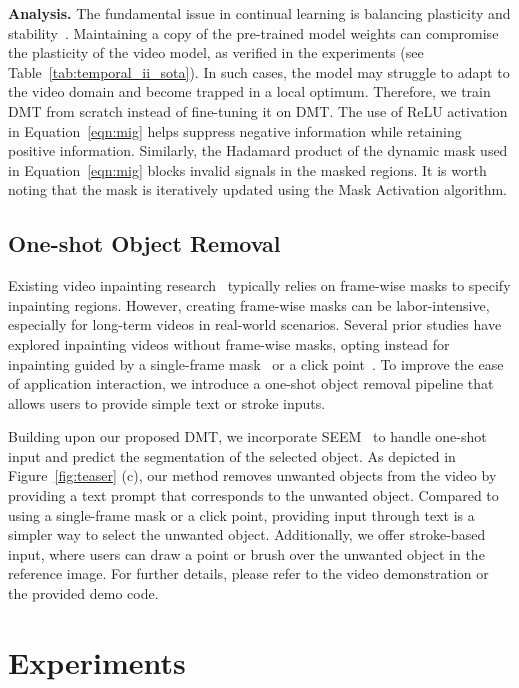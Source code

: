\documentclass[10pt,twocolumn,letterpaper]{article}
\begin{document}
{\noindent\bf Analysis.} The fundamental issue in continual learning is balancing plasticity and stability~\cite{mermillod2013stability}. Maintaining a copy of the pre-trained model weights can compromise the plasticity of the video model, as verified in the experiments (see Table~\ref{tab:temporal_ii_sota}). In such cases, the model may struggle to adapt to the video domain and become trapped in a local optimum. Therefore, we train DMT from scratch instead of fine-tuning it on DMT. The use of ReLU activation in Equation~\ref{eqn:mig} helps suppress negative information while retaining positive information. Similarly, the Hadamard product of the dynamic mask  used in Equation~\ref{eqn:mig} blocks invalid signals in the masked regions. It is worth noting that the mask  is iteratively updated using the Mask Activation algorithm.

\subsection{One-shot Object Removal}

Existing video inpainting research~\cite{li22e2fgvi,zhang22flow,cai22devit} typically relies on frame-wise masks to specify inpainting regions. However, creating frame-wise masks can be labor-intensive, especially for long-term videos in real-world scenarios. Several prior studies have explored inpainting videos without frame-wise masks, opting instead for inpainting guided by a single-frame mask~\cite{ouyang21inter, lee2023one} or a click point~\cite{yang2023track}. To improve the ease of application interaction, we introduce a one-shot object removal pipeline that allows users to provide simple text or stroke inputs.

Building upon our proposed DMT, we incorporate SEEM~\cite{zou2023seem} to handle one-shot input and predict the segmentation of the selected object. As depicted in Figure~\ref{fig:teaser} (c), our method removes unwanted objects from the video by providing a text prompt that corresponds to the unwanted object. Compared to using a single-frame mask or a click point, providing input through text is a simpler way to select the unwanted object. Additionally, we offer stroke-based input, where users can draw a point or brush over the unwanted object in the reference image. For further details, please refer to the video demonstration or the provided demo code.
 
\section{Experiments}
\end{document}
